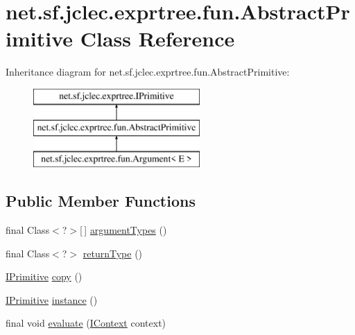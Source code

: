 \hypertarget{classnet_1_1sf_1_1jclec_1_1exprtree_1_1fun_1_1_abstract_primitive}{\section{net.\-sf.\-jclec.\-exprtree.\-fun.\-Abstract\-Primitive Class Reference}
\label{classnet_1_1sf_1_1jclec_1_1exprtree_1_1fun_1_1_abstract_primitive}
}
Inheritance diagram for net.\-sf.\-jclec.\-exprtree.\-fun.\-Abstract\-Primitive\-:\begin{figure}[H]
\begin{center}
\leavevmode
\includegraphics[height=3.000000cm]{classnet_1_1sf_1_1jclec_1_1exprtree_1_1fun_1_1_abstract_primitive}
\end{center}
\end{figure}
\subsection*{Public Member Functions}
\begin{DoxyCompactItemize}
\item 
final Class$<$?$>$\mbox{[}$\,$\mbox{]} \hyperlink{classnet_1_1sf_1_1jclec_1_1exprtree_1_1fun_1_1_abstract_primitive_a2f87e83f4dded5ff4a2278bbda54259c}{argument\-Types} ()
\item 
final Class$<$?$>$ \hyperlink{classnet_1_1sf_1_1jclec_1_1exprtree_1_1fun_1_1_abstract_primitive_ac3a0a1d9c1dd4935186976e6682c6acc}{return\-Type} ()
\item 
\hyperlink{interfacenet_1_1sf_1_1jclec_1_1exprtree_1_1_i_primitive}{I\-Primitive} \hyperlink{classnet_1_1sf_1_1jclec_1_1exprtree_1_1fun_1_1_abstract_primitive_ae38668f23b7b6d0833297ec42d9c48ee}{copy} ()
\item 
\hyperlink{interfacenet_1_1sf_1_1jclec_1_1exprtree_1_1_i_primitive}{I\-Primitive} \hyperlink{classnet_1_1sf_1_1jclec_1_1exprtree_1_1fun_1_1_abstract_primitive_acf7385b0b8a3f1405fe81bddddef8d1f}{instance} ()
\item 
final void \hyperlink{classnet_1_1sf_1_1jclec_1_1exprtree_1_1fun_1_1_abstract_primitive_a384b3d3dfc3841ea12ccfe06dd328c85}{evaluate} (\hyperlink{interfacenet_1_1sf_1_1jclec_1_1exprtree_1_1_i_context}{I\-Context} context)
\end{DoxyCompactItemize}
